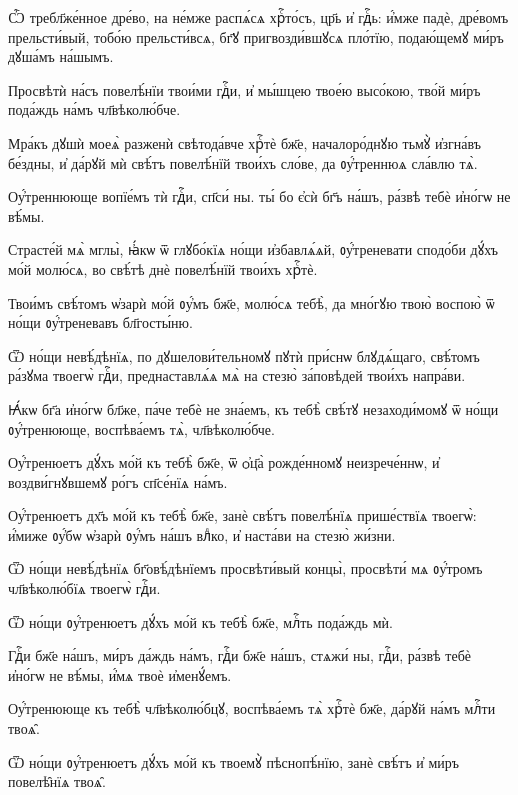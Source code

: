 \hKv Ѽ требл҃же́нное дре́во, на не́мже  распѧ́сѧ хрⷭ҇то́съ, цр҃ь и҆ гдⷭ҇ь: и҆́мже падѐ, дре́вомъ  прельсти́вый, тобо́ю прельсти́всѧ, бг҃ꙋ пригвозди́вшꙋсѧ  пло́тїю, подаю́щемꙋ ми́ръ дꙋша́мъ на́шымъ. 
%

\hKv Просвѣтѝ на́съ повелѣ́нїи твои́ми гдⷭ҇и, и҆ мы́шцею  твое́ю высо́кою, тво́й ми́ръ пода́ждь на́мъ чл҃вѣколю́бче. 

\hKv Мра́къ дꙋшѝ моеѧ̀ разженѝ свѣтода́вче хрⷭ҇тѐ бж҃е,  началоро́днꙋю тьмꙋ̀ и҆згна́въ бе́здны, и҆ да́рꙋй мѝ свѣ́тъ  повелѣ́нїй твои́хъ сло́ве, да ᲂу҆́треннюѧ сла́влю тѧ̀. 

\hKv Оу҆́треннююще вопїе́мъ тѝ гдⷭ҇и, сп҃си́ ны. ты́ бо є҆сѝ  бг҃ъ на́шъ, ра́звѣ тебѐ и҆но́гѡ не вѣ́мы. 

\hKv Страсте́й мѧ̀ мглы̀, ꙗ҆́кѡ ѿ глꙋбо́кїѧ но́щи и҆збавлѧ́ѧй,  ᲂу҆́треневати сподо́би дꙋ́хъ мо́й молю́сѧ, во свѣ́тѣ днѐ  повелѣ́нїй твои́хъ хрⷭ҇тѐ.  

\hKv Твои́мъ свѣ́томъ ѡ҆зарѝ мо́й ᲂу҆́мъ бж҃е, молю́сѧ тебѣ̀,  да мно́гꙋю твою̀ воспою̀ ѿ но́щи ᲂу҆́треневавъ  бл҃госты́ню. 

\hKv Ѿ но́щи невѣ́дѣнїѧ, по дꙋшелови́тельномꙋ пꙋтѝ при́снѡ  блꙋдѧ́щаго, свѣ́томъ ра́зꙋма твоегѡ̀ гдⷭ҇и, преднаставлѧ́ѧ  мѧ̀ на стезю̀ за́повѣдей твои́хъ напра́ви. 

\hKv Ꙗ҆́кѡ бг҃а и҆но́гѡ бл҃же, па́че тебѐ не зна́емъ, къ тебѣ̀  свѣ́тꙋ незаходи́момꙋ ѿ но́щи ᲂу҆́тренююще, воспѣва́емъ  тѧ̀, чл҃вѣколю́бче. 

\hKv Оу҆́тренюетъ дꙋ́хъ мо́й къ тебѣ̀ бж҃е, ѿ ѻ҆ц҃а̀  рожде́нномꙋ неизрече́ннѡ, и҆ воздви́гнꙋвшемꙋ ро́гъ сп҃се́нїѧ  на́мъ. 

\hKv Оу҆́тренюетъ дх҃ъ мо́й къ тебѣ̀ бж҃е, занѐ свѣ́тъ  повелѣ́нїѧ прише́ствїѧ твоегѡ̀: и҆́миже ᲂу҆́бѡ ѡ҆зарѝ  ᲂу҆́мъ на́шъ влⷣко, и҆ наста́ви на стезю̀ жи́зни. 

\hKv Ѿ но́щи невѣ́дѣнїѧ бг҃овѣ́дѣнїемъ просвѣти́вый  концы̀, просвѣти́ мѧ ᲂу҆́тромъ чл҃вѣколю́бїѧ твоегѡ̀  гдⷭ҇и.  

\hKv Ѿ но́щи ᲂу҆́тренюетъ дꙋ́хъ мо́й къ тебѣ̀ бж҃е, млⷭ҇ть  пода́ждь мѝ. 
%

\hKv Гдⷭ҇и бж҃е на́шъ,  ми́ръ да́ждь на́мъ, гдⷭ҇и бж҃е на́шъ, стѧжи́ ны, гдⷭ҇и,  ра́звѣ тебѐ и҆но́гѡ не вѣ́мы, и҆́мѧ твоѐ и҆менꙋ́емъ. 

\hKv Оу҆́тренююще къ тебѣ̀ чл҃вѣколю́бцꙋ, воспѣва́емъ тѧ̀  хрⷭ҇тѐ бж҃е, да́рꙋй на́мъ млⷭ҇ти твоѧ̑. 

\hKv Ѿ но́щи ᲂу҆́тренюетъ дꙋ́хъ мо́й къ твоемꙋ̀ пѣснопѣ́нїю,  занѐ свѣ́тъ и҆ ми́ръ повелѣ̑нїѧ твоѧ̑. 

